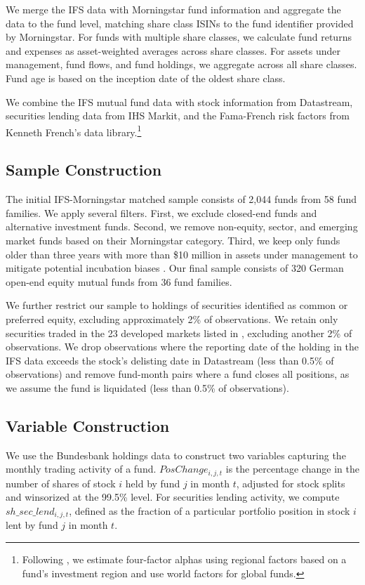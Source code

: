 We merge the IFS data with Morningstar fund information and aggregate the data to the fund level, matching share class ISINs to the fund identifier provided by Morningstar. For funds with multiple share classes, we calculate fund returns and expenses as asset-weighted averages across share classes. For assets under management, fund flows, and fund holdings, we aggregate across all share classes. Fund age is based on the inception date of the oldest share class.

We combine the IFS mutual fund data with stock information from Datastream, securities lending data from IHS Markit, and the Fama-French risk factors from Kenneth French's data library.\footnote{Following \citet{Ferreira_etal2018JF}, we estimate four-factor alphas using regional factors based on a fund's investment region and use world factors for global funds.}

\subsection{Sample Construction}

The initial IFS-Morningstar matched sample consists of 2,044 funds from 58 fund families. We apply several filters. First, we exclude closed-end funds and alternative investment funds. Second, we remove non-equity, sector, and emerging market funds based on their Morningstar category. Third, we keep only funds older than three years with more than \$10 million in assets under management to mitigate potential incubation biases \citep{evans:2010}. Our final sample consists of 320 German open-end equity mutual funds from 36 fund families.

We further restrict our sample to holdings of securities identified as common or preferred equity, excluding approximately 2\% of observations. We retain only securities traded in the 23 developed markets listed in \citet{fama_french:2012}, excluding another 2\% of observations. We drop observations where the reporting date of the holding in the IFS data exceeds the stock's delisting date in Datastream (less than 0.5\% of observations) and remove fund-month pairs where a fund closes all positions, as we assume the fund is liquidated (less than 0.5\% of observations).

\subsection{Variable Construction}

We use the Bundesbank holdings data to construct two variables capturing the monthly trading activity of a fund. $PosChange_{i,j,t}$ is the percentage change in the number of shares of stock $i$ held by fund $j$ in month $t$, adjusted for stock splits and winsorized at the 99.5\% level. For securities lending activity, we compute $sh\_sec\_lend_{i,j,t}$, defined as the fraction of a particular portfolio position in stock $i$ lent by fund $j$ in month $t$.

